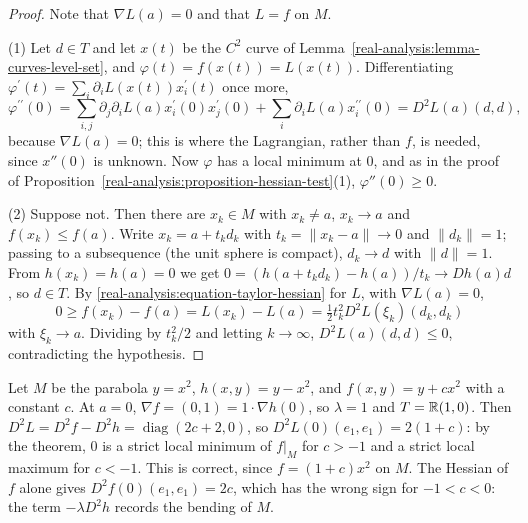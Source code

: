 \begin{proof}
Note that $\nabla L(a) = 0$ and that $L = f$ on $M$.

(1) Let $d \in T$ and let $x(t)$ be the $C^2$ curve of Lemma~\ref{real-analysis:lemma-curves-level-set}, and $\varphi(t) = f(x(t)) = L(x(t))$. Differentiating
$\varphi^{\prime}(t) = \sum_i\partial_iL(x(t))x_i^{\prime}(t)$ once more,
\[
\varphi^{\prime\prime}(0) = \sum_{i,j}\partial_j\partial_iL(a)x_i^{\prime}(0)x_j^{\prime}(0) + \sum_i\partial_iL(a)x_i^{\prime\prime}(0) = D^2L(a)(d, d),
\]
because $\nabla L(a) = 0$; this is where the Lagrangian, rather than $f$, is needed, since $x''(0)$ is unknown. Now $\varphi$ has a local minimum at $0$, and as in the proof of
Proposition~\ref{real-analysis:proposition-hessian-test}(1), $\varphi''(0) \geq 0$.

(2) Suppose not. Then there are $x_k \in M$ with $x_k \neq a$, $x_k \to a$ and $f(x_k) \leq f(a)$. Write $x_k = a + t_kd_k$ with $t_k = \|x_k - a\| \to 0$ and $\|d_k\| = 1$; passing to a subsequence
(the unit sphere is compact), $d_k \to d$ with $\|d\| = 1$. From $h(x_k) = h(a) = 0$ we get $0 = (h(a + t_kd_k) - h(a))/t_k \to Dh(a)d$, so $d \in T$. By \eqref{real-analysis:equation-taylor-hessian} for $L$,
with $\nabla L(a) = 0$,
\[
0 \geq f(x_k) - f(a) = L(x_k) - L(a) = \tfrac12t_k^2D^2L(\xi_k)(d_k, d_k)
\]
with $\xi_k \to a$. Dividing by $t_k^2/2$ and letting $k \to \infty$, $D^2L(a)(d, d) \leq 0$, contradicting the hypothesis.
\end{proof}

\begin{example}\label{real-analysis:example-second-order}
Let $M$ be the parabola $y = x^2$, $h(x, y) = y - x^2$, and $f(x, y) = y + cx^2$ with a constant $c$. At $a = 0$, $\nabla f = (0, 1) = 1 \cdot \nabla h(0)$, so $\lambda = 1$ and $T = \mathbb{R}(1, 0)$. Then
$D^2L = D^2f - D^2h = \operatorname{diag}(2c + 2, 0)$, so $D^2L(0)(e_1, e_1) = 2(1 + c)$: by the theorem, $0$ is a strict local minimum of $f|_M$ for $c > -1$ and a strict local maximum for $c < -1$.
This is correct, since $f = (1 + c)x^2$ on $M$. The Hessian of $f$ alone gives $D^2f(0)(e_1, e_1) = 2c$, which has the wrong sign for $-1 < c < 0$: the term $-\lambda D^2h$ records the bending of $M$.
\end{example}

